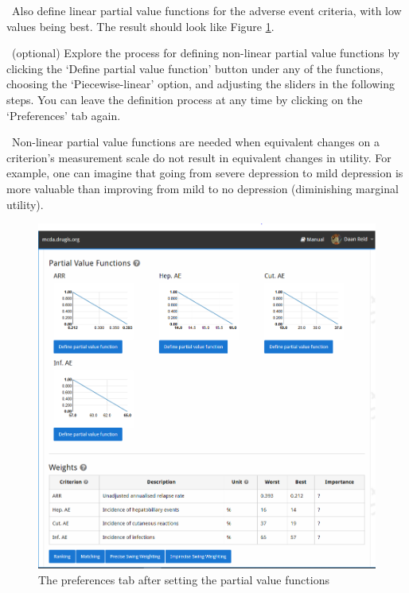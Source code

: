 \documentclass[00_mcda_tutorial.tex]{subfiles}
\begin{document}
\noindent \leftpointright \, Also define linear partial value functions for the adverse event criteria, with low values being best. The result should look like Figure \ref{fig:preferences}.
\newline

\noindent \leftpointright \, (optional) Explore the process for defining non-linear partial value functions by clicking the ‘Define partial value function’ button under any of the functions, choosing the ‘Piecewise-linear’ option, and adjusting the sliders in the following steps. You can leave the definition process at any time by clicking on the ‘Preferences’ tab again.
\newline

\noindent \faGraduationCap \, Non-linear partial value functions are needed when equivalent changes on a criterion’s measurement scale do not result in equivalent changes in utility.  For example, one can imagine that going from severe depression to mild depression is more valuable than improving from mild to no depression (diminishing marginal utility).

\begin{figure}[!h]
    \centering
	\includegraphics[width=\textwidth]{fig/preferences.png}
    \caption{The preferences tab after setting the partial value functions}
	\label{fig:preferences}
\end{figure}
\end{document}

